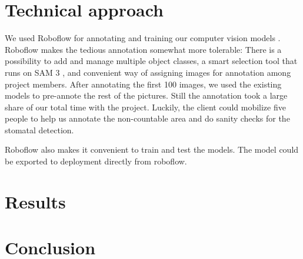 \documentclass[a4paper,12pt,bibliography=totoc,numbers=noenddot,sfdefaults=false,abstract=true,notitlepage]{scrartcl} %
\begin{document}
	
	\section{Technical approach}\label{methods}

	We used Roboflow for annotating and training our computer vision models \autocite{dwyer2024roboflow}. Roboflow makes the tedious annotation somewhat more tolerable: There is a possibility to add and manage multiple object classes, a smart selection tool that runs on SAM 3 \autocite{carionSAM3Segment2025}, and convenient way of assigning images for annotation among project members. After annotating the first 100 images, we used the existing models to pre-annote the rest of the pictures. Still the annotation took a large share of our total time with the project. Luckily, the  client could mobilize five people to help us annotate the non-countable area and do sanity checks for the stomatal detection.

	Roboflow also makes it convenient to train and test the models. The model could be exported to deployment directly from roboflow.


	
	
	
	\section{Results}\label{results}



	
	
	
	\section{Conclusion}\label{conclusion}
\end{document}
